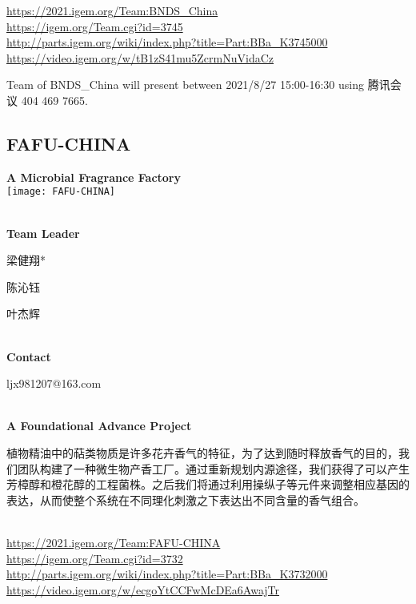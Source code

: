 \url{https://2021.igem.org/Team:BNDS\_China }\\
\url{https://igem.org/Team.cgi?id=3745 }\\
\url{http://parts.igem.org/wiki/index.php?title=Part:BBa_K3745000 }\\
\url{https://video.igem.org/w/tB1zS41mu5ZcrmNuVidaCz }\\

\vfill{}









Team of BNDS\_China will present between  2021/8/27 15:00-16:30       using 腾讯会议 404 469 7665.
\newpage


\subsection{\textcolor{Blu}{ FAFU-CHINA } }
\vspace{5mm}
\begin{center}
\large{
  \textbf{ A Microbial Fragrance Factory }\\

  \texttt{[image: FAFU-CHINA]}
}
\end{center}
\textbf{\\Team Leader}

  梁健翔*

  陈沁钰

  叶杰辉


\textbf{\\Contact}

  ljx981207@163.com


\textbf{\\A Foundational Advance Project\\}\begin{spacing}{1.5}

植物精油中的萜类物质是许多花卉香气的特征，为了达到随时释放香气的目的，我们团队构建了一种微生物产香工厂。通过重新规划内源途径，我们获得了可以产生芳樟醇和橙花醇的工程菌株。之后我们将通过利用操纵子等元件来调整相应基因的表达，从而使整个系统在不同理化刺激之下表达出不同含量的香气组合。\end{spacing}
\\

\url{https://2021.igem.org/Team:FAFU-CHINA }\\
\url{https://igem.org/Team.cgi?id=3732 }\\
\url{http://parts.igem.org/wiki/index.php?title=Part:BBa_K3732000 }\\
\url{https://video.igem.org/w/ecgoYtCCFwMcDEa6AwajTr }\\

